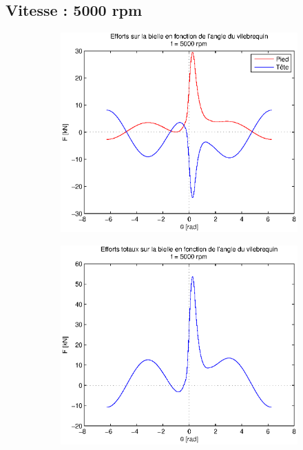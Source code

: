 \documentclass{article}
\begin{document}
\subsection{Vitesse : 5000 rpm}
\begin{figure}
\centering
    \begin{subfigure}[b]{0.45\textwidth}
    \includegraphics[scale=0.5]{Schema/forces_5000rpm.eps}
                \caption{}
                \label{fig:forces_5000rpm}
    \end{subfigure}
    \begin{subfigure}[b]{0.45\textwidth}
                \includegraphics[scale=0.5]{Schema/forces_tot_5000rpm.eps}
                \caption{}
                \label{fig:forces_tot_5000rpm}
    \end{subfigure}
\end{figure}
\end{document}
